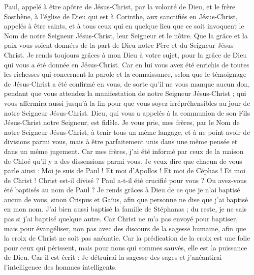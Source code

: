 \begin{multicols}{2}
\VerseOne{}Paul, appelé à être apôtre de Jésus-Christ, par la volonté de Dieu, et le frère Sosthène,
à l'église de Dieu qui est à Corinthe, aux sanctifiés en Jésus-Christ, appelés à être saints, et à tous ceux qui en quelque lieu que ce soit invoquent le Nom de notre Seigneur Jésus-Christ, leur Seigneur et le nôtre.
Que la grâce et la paix vous soient données de la part de Dieu notre Père et du Seigneur Jésus-Christ.
Je rends toujours grâces à mon Dieu à votre sujet, pour la grâce de Dieu qui vous a été donnée en Jésus-Christ.
Car en lui vous avez été enrichis de toutes les richesses qui concernent la parole et la connaissance,
selon que le témoignage de Jésus-Christ a été confirmé en vous,
de sorte qu'il ne vous manque aucun don, pendant que vous attendez la manifestation de notre Seigneur Jésus-Christ ;
qui vous affermira aussi jusqu'à la fin pour que vous soyez irrépréhensibles au jour de notre Seigneur Jésus-Christ.
Dieu, qui vous a appelés à la communion de son Fils Jésus-Christ notre Seigneur, est fidèle.
Je vous prie, mes frères, par le Nom de notre Seigneur Jésus-Christ, à tenir tous un même langage, et à ne point avoir de divisions parmi vous, mais à être parfaitement unis dans une même pensée et dans un même jugement.
Car mes frères, j'ai été informé par ceux de la maison de Chloé qu'il y a des dissensions parmi vous.
Je veux dire que chacun de vous parle ainsi : Moi je suis de Paul ! Et moi d'Apollos ! Et moi de Céphas ! Et moi de Christ !
Christ est-il divisé ? Paul a-t-il été crucifié pour vous ? Ou avez-vous été baptisés au nom de Paul ?
Je rends grâces à Dieu de ce que je n'ai baptisé aucun de vous, sinon Crispus et Gaïus,
afin que personne ne dise que j'ai baptisé en mon nom.
J'ai bien aussi baptisé la famille de Stéphanas ; du reste, je ne sais pas si j'ai baptisé quelque autre.
Car Christ ne m'a pas envoyé pour baptiser, mais pour évangéliser, non pas avec des discours de la sagesse humaine, afin que la croix de Christ ne soit pas anéantie.
Car la prédication de la croix est une folie pour ceux qui périssent, mais pour nous qui sommes sauvés, elle est la puissance de Dieu.
Car il est écrit : Je détruirai la sagesse des sages et j'anéantirai l'intelligence des hommes intelligents.

\end{multicols}
